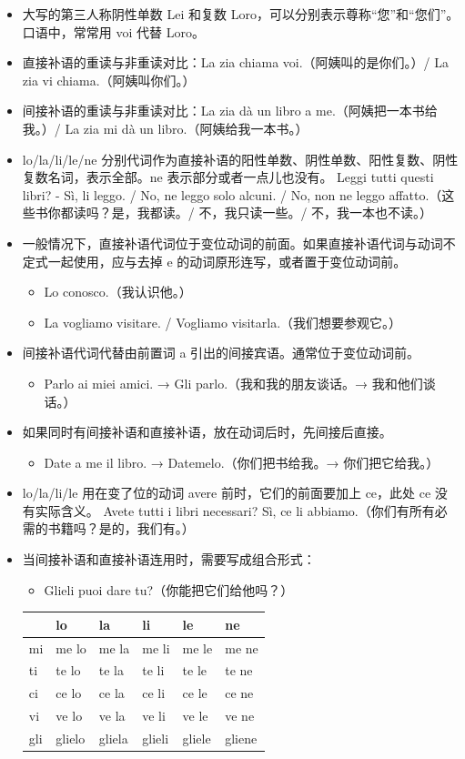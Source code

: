\documentclass[UTF8,a4paper,titlepage,10pt]{report}
\begin{document}
\begin{enumerate}
\begin{itemize}
\item 大写的第三人称阴性单数 Lei 和复数 Loro，可以分别表示尊称“您”和“您们”。口语中，常常用 voi 代替 Loro。
\item 直接补语的重读与非重读对比：La zia chiama voi.（阿姨叫的是你们。）/ La zia vi chiama.（阿姨叫你们。）
\item 间接补语的重读与非重读对比：La zia dà un libro a me.（阿姨把一本书给我。）/ La zia mi dà un libro.（阿姨给我一本书。）
\item lo/la/li/le/ne 分别代词作为直接补语的阳性单数、阴性单数、阳性复数、阴性复数名词，表示全部。ne 表示部分或者一点儿也没有。
Leggi tutti questi libri? - Sì, li leggo. / No, ne leggo solo alcuni. / No, non ne leggo affatto.（这些书你都读吗？是，我都读。/ 不，我只读一些。/ 不，我一本也不读。）
\item 一般情况下，直接补语代词位于变位动词的前面。如果直接补语代词与动词不定式一起使用，应与去掉 e 的动词原形连写，或者置于变位动词前。
\begin{itemize}
\item Lo conosco.（我认识他。）
\item La vogliamo visitare. / Vogliamo visitarla.（我们想要参观它。）
\end{itemize}
\item 间接补语代词代替由前置词 a 引出的间接宾语。通常位于变位动词前。
\begin{itemize}
\item Parlo ai miei amici. → Gli parlo.（我和我的朋友谈话。→ 我和他们谈话。）
\end{itemize}
\item 如果同时有间接补语和直接补语，放在动词后时，先间接后直接。
\begin{itemize}
\item Date a me il libro. → Datemelo.（你们把书给我。→ 你们把它给我。）
\end{itemize}
\item lo/la/li/le 用在变了位的动词 avere 前时，它们的前面要加上 ce，此处 ce 没有实际含义。
Avete tutti i libri necessari? Sì, ce li abbiamo.（你们有所有必需的书籍吗？是的，我们有。）
\item 当间接补语和直接补语连用时，需要写成组合形式：
\begin{itemize}
\item Glieli puoi dare tu?（你能把它们给他吗？）
\end{itemize}
\begin{center}
\begin{tabular}{llllll}
 & lo & la & li & le & ne\\
\hline
mi & me lo & me la & me li & me le & me ne\\
ti & te lo & te la & te li & te le & te ne\\
ci & ce lo & ce la & ce li & ce le & ce ne\\
vi & ve lo & ve la & ve li & ve le & ve ne\\
gli & glielo & gliela & glieli & gliele & gliene\\
\end{tabular}
\end{center}
\end{itemize}


\end{enumerate}
\end{document}
